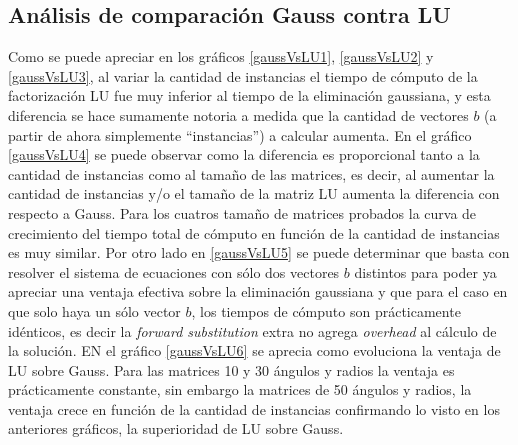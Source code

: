 \subsection{Análisis de comparación Gauss contra LU}
Como se puede apreciar en los gráficos \ref{gaussVsLU1}, \ref{gaussVsLU2} y \ref{gaussVsLU3}, al
variar la cantidad de instancias el tiempo de cómputo de la factorización LU fue muy inferior al
tiempo de la eliminación gaussiana, y esta diferencia se hace sumamente notoria a medida que la
cantidad de vectores $b$ (a partir de ahora simplemente ``instancias'') a calcular aumenta. En el gráfico 
\ref{gaussVsLU4} se puede observar como la diferencia es proporcional tanto a la cantidad de instancias como al 
tamaño de las matrices, es decir, al aumentar la cantidad de instancias y/o el tamaño de la matriz LU aumenta 
la diferencia con respecto a Gauss. Para los cuatros tamaño de matrices probados la curva de crecimiento del tiempo total de cómputo en función de la cantidad de instancias es muy similar. Por otro lado en \ref{gaussVsLU5} se puede determinar que basta con resolver el 
sistema de ecuaciones con sólo dos vectores $b$ distintos para poder ya apreciar una ventaja efectiva sobre la eliminación gaussiana 
y que para el caso en que solo haya un sólo vector $b$, los tiempos de cómputo son prácticamente idénticos, es decir la 
\emph{forward substitution} extra no agrega \emph{overhead} al cálculo de la solución. EN el gráfico \ref{gaussVsLU6} se aprecia como evoluciona la ventaja de LU sobre Gauss. Para las matrices 10 y 30 ángulos y radios la ventaja es prácticamente constante, sin embargo la matrices de 50 ángulos y radios, la ventaja crece en función de la cantidad de instancias confirmando lo visto en los anteriores gráficos, la superioridad de LU sobre Gauss.
